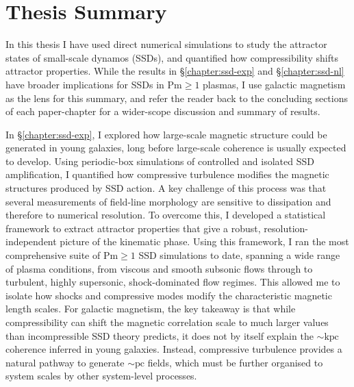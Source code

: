 \documentclass[12pt,twoside]{extreport}
\begin{document}
\section{Thesis Summary}

In this thesis I have used direct numerical simulations to study the attractor states of small-scale dynamos (SSDs), and quantified how compressibility shifts attractor properties. While the results in \S\ref{chapter:ssd-exp} and \S\ref{chapter:ssd-nl} have broader implications for SSDs in $\mathrm{Pm} \geq 1$ plasmas, I use galactic magnetism as the lens for this summary, and refer the reader back to the concluding sections of each paper-chapter for a wider-scope discussion and summary of results.

In \S\ref{chapter:ssd-exp}, I explored how large-scale magnetic structure could be generated in young galaxies, long before large-scale coherence is usually expected to develop. Using periodic-box simulations of controlled and isolated SSD amplification, I quantified how compressive turbulence modifies the magnetic structures produced by SSD action. A key challenge of this process was that several measurements of field-line morphology are sensitive to dissipation and therefore to numerical resolution. To overcome this, I developed a statistical framework to extract attractor properties that give a robust, resolution-independent picture of the kinematic phase. Using this framework, I ran the most comprehensive suite of $ \mathrm{Pm} \geq 1 $ SSD simulations to date, spanning a wide range of plasma conditions, from viscous and smooth subsonic flows through to turbulent, highly supersonic, shock-dominated flow regimes. This allowed me to isolate how shocks and compressive modes modify the characteristic magnetic length scales. For galactic magnetism, the key takeaway is that while compressibility can shift the magnetic correlation scale to much larger values than incompressible SSD theory predicts, it does not by itself explain the $\sim \mathrm{kpc}$ coherence inferred in young galaxies. Instead, compressive turbulence provides a natural pathway to generate $\sim \mathrm{pc}$ fields, which must be further organised to system scales by other system-level processes.
\end{document}

